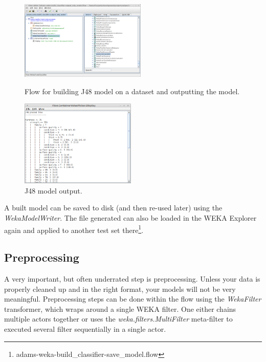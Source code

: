 \begin{figure}[ht]
  \begin{minipage}[t]{0.5\linewidth}
    \centering
    \includegraphics[width=6.0cm]{images/basic-building_model1-flow.png}
    \caption{Flow for building J48 model on a dataset and outputting the model.}
    \label{basic-building_model1-flow}
  \end{minipage}
  \hspace{0.5cm}
  \begin{minipage}[t]{0.5\linewidth}
    \centering
    \includegraphics[width=5.5cm]{images/basic-building_model1-output.png}
    \caption{J48 model output.}
    \label{basic-building_model1-output}
  \end{minipage}
\end{figure}

A built model can be saved to disk (and then re-used later) using the
\textit{WekaModelWriter}. The file generated can also be loaded in the WEKA
Explorer again and applied to another test set
there\footnote{adams-weka-build\_classifier-save\_model.flow}.

\subsection{Preprocessing}
A very important, but often underrated step is preprocessing. Unless your data
is properly cleaned up and in the right format, your models will not be very
meaningful. Preprocessing steps can be done within the flow using the
\textit{WekaFilter} transformer, which wraps around a single WEKA filter. One
either chains multiple actors together or uses the
\textit{weka.filters.MultiFilter} meta-filter to executed several filter
sequentially in a single actor.

